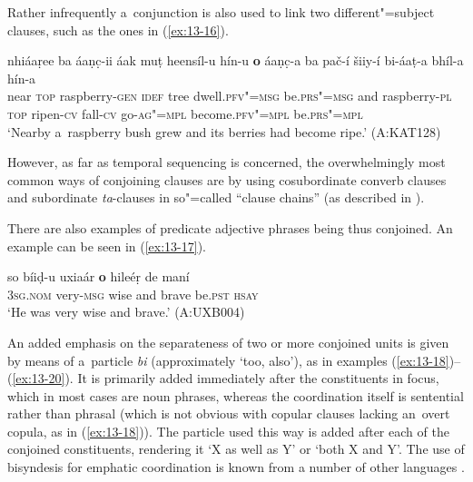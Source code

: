 Rather infrequently a~conjunction is also used to link two different"=subject clauses, such as the ones in (\ref{ex:13-16}).

\ea
\label{ex:13-16}
\gll nhiáaṛee ba {\ob}áaṇc̣-ii áak muṭ heensíl-u hín-u \textbf{o} áaṇc̣-a ba pač-í šiiy-í bi-áaṭ-a bhíl-a hín-a{\cb}\\
near \textsc{top} raspberry-\textsc{gen} \textsc{idef} tree dwell.\textsc{pfv"=msg}  be.\textsc{prs"=msg} and raspberry-\textsc{pl} \textsc{top} ripen-\textsc{cv} fall-\textsc{cv} go-\textsc{ag"=mpl} become.\textsc{pfv"=mpl} be.\textsc{prs"=mpl} \\
\glt `Nearby a~raspberry bush grew and its berries had become ripe.' (A:KAT128) 
\z

However, as far as temporal sequencing is concerned, the overwhelmingly most common ways of conjoining clauses are by using cosubordinate converb clauses and subordinate \textit{ta}-clauses in so"=called ``clause chains'' (as described in ).


There are also examples of predicate adjective phrases being thus conjoined. An example can be seen in (\ref{ex:13-17}).

\begin{exe}
\ex
\label{ex:13-17}
\gll so bíiḍ-u {\ob}uxiaár \textbf{o} hileéṛ{\cb} de maní  \\
\textsc{3sg.nom} very-\textsc{msg} wise and brave be.\textsc{pst} \textsc{hsay} \\
\glt `He was very wise and brave.' (A:UXB004) 
\end{exe}

 An added emphasis on the separateness of two or more conjoined units is given by means of a~particle \textit{bi} (approximately `too, also'), as in examples (\ref{ex:13-18})--(\ref{ex:13-20}). It is primarily added immediately after the constituents in focus, which in most cases are noun phrases, whereas the coordination itself is sentential rather than phrasal (which is not obvious with copular clauses lacking an~overt copula, as in (\ref{ex:13-18})). The particle used this way is added after each of the conjoined constituents, rendering it `X as well as Y' or `both X and Y'. The use of bisyndesis for emphatic coordination is known from a number of other languages \citep[15--17]{haspelmath2007}. 

